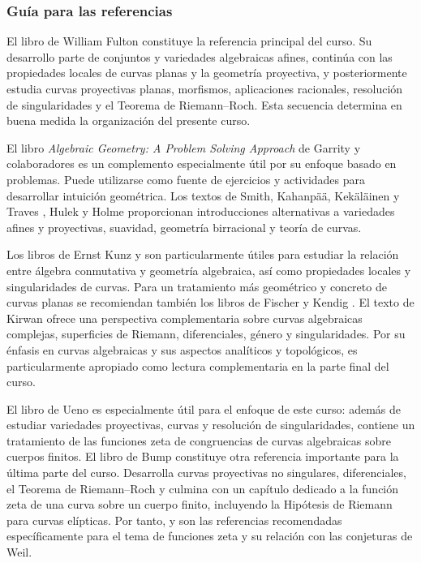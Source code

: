 \begin{refsection}
\subsubsection*{Guía para las referencias}

El libro de William Fulton \cite{Ful89} constituye la referencia principal del curso. Su desarrollo parte de conjuntos y variedades algebraicas afines, continúa con las propiedades locales de curvas planas y la geometría proyectiva, y posteriormente estudia curvas proyectivas planas, morfismos, aplicaciones racionales, resolución de singularidades y el Teorema de Riemann--Roch. Esta secuencia determina en buena medida la organización del presente curso.

El libro \emph{Algebraic Geometry: A Problem Solving Approach} de Garrity y colaboradores \cite{Gar13} es un complemento especialmente útil por su enfoque basado en problemas. Puede utilizarse como fuente de ejercicios y actividades para desarrollar intuición geométrica. Los textos de Smith, Kahanpää, Kekäläinen y Traves \cite{SKKT00}, Hulek \cite{Hul03} y Holme \cite{Hol12} proporcionan introducciones alternativas a variedades afines y proyectivas, suavidad, geometría birracional y teoría de curvas.

Los libros de Ernst Kunz \cite{Kun13} y \cite{Kun05} son particularmente útiles para estudiar la relación entre álgebra conmutativa y geometría algebraica, así como propiedades locales y singularidades de curvas. Para un tratamiento más geométrico y concreto de curvas planas se recomiendan también los libros de Fischer \cite{Fis01} y Kendig \cite{Ken11}. El texto de Kirwan \cite{Kir92} ofrece una perspectiva complementaria sobre curvas algebraicas complejas, superficies de Riemann, diferenciales, género y singularidades. Por su énfasis en curvas algebraicas y sus aspectos analíticos y topológicos, es particularmente apropiado como lectura complementaria en la parte final del curso.

El libro de Ueno \cite{Uen97} es especialmente útil para el enfoque de este curso: además de estudiar variedades proyectivas, curvas y resolución de singularidades, contiene un tratamiento de las funciones zeta de congruencias de curvas algebraicas sobre cuerpos finitos. El libro de Bump \cite{Bum98} constituye otra referencia importante para la última parte del curso. Desarrolla curvas proyectivas no singulares, diferenciales, el Teorema de Riemann--Roch y culmina con un capítulo dedicado a la función zeta de una curva sobre un cuerpo finito, incluyendo la Hipótesis de Riemann para curvas elípticas. Por tanto, \cite{Uen97} y \cite{Bum98} son las referencias recomendadas específicamente para el tema de funciones zeta y su relación con las conjeturas de Weil.

\nocite{Ful89}
\nocite{Gar13}
\nocite{Uen97}
\nocite{SKKT00}
\nocite{Kun13}
\nocite{Hol12}
\nocite{Bum98}
\nocite{Hul03}
\nocite{Kun05}
\nocite{Fis01}
\nocite{Ken11}
\nocite{Kir92}

\printcursosbibliography
\end{refsection}
